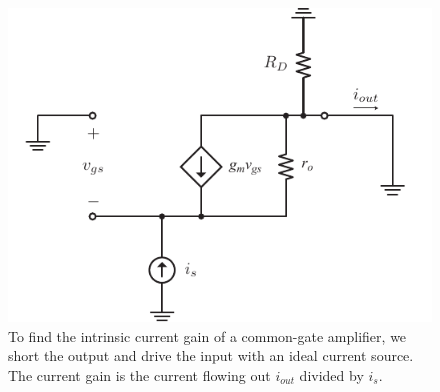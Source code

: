 \begin{figure}[t]
\centering
\includegraphics[scale=1.15]{cgamp_is_ac_ss_short}
\caption{To find the intrinsic current gain of a common-gate amplifier, we short the output and drive the input with an ideal current source.  The current gain is the current flowing out $i_{out}$ divided by $i_s$.}
\label{fig:cgamp_is_ac_ss_short}
\end{figure}
